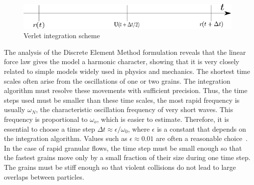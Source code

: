 \begin{figure}[htbp]
\centering
\includegraphics{Leap}
\caption{Verlet integration scheme}
\label{fig:verlet}
\end{figure}
The analysis of the Discrete Element Method formulation reveals that the linear 
force law gives 
the 
model a harmonic character, showing that it is very closely related to simple 
models widely used 
in 
physics and mechanics. The shortest time scales often arise from the 
oscillations of one or two 
grains. The integration algorithm must resolve these movements with sufficient 
precision. Thus, 
the 
time steps used must be smaller than these time scales, the most rapid 
frequency is usually 
${\omega}_{\mathit{N}}$, the characteristic oscillation frequency of very short 
waves. This 
frequency is proportional to $\omega _{o}$, which is easier to estimate. 
Therefore, it is 
essential 
to choose a time step $\Delta t \approx \epsilon / \omega_{0}$, where 
$\epsilon$ is a constant 
that 
depends on the integration algorithm. Values such as $\epsilon \approx 0.01$ 
are often a 
reasonable 
choice~\citep{Sean2011}. In the case of rapid granular flows, the time step 
must be small enough 
so 
that the fastest grains move only by a small fraction of their size during one 
time step. The 
grains must be stiff enough so that violent collisions do not lead to large 
overlaps between 
particles. 
